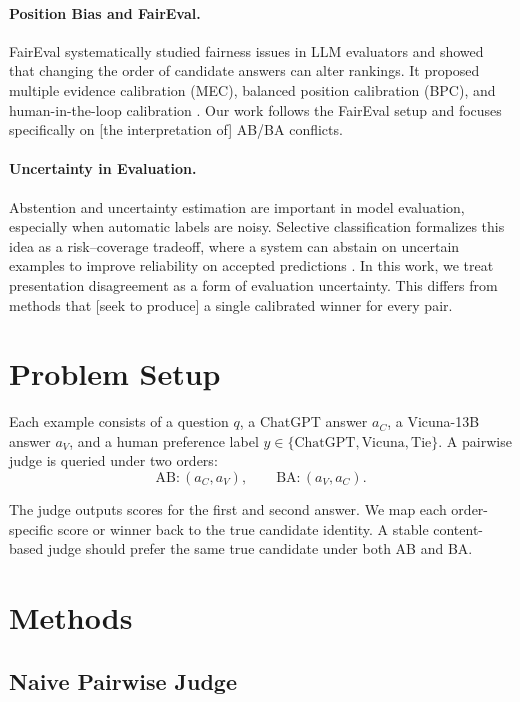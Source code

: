 \documentclass[11pt]{article}
\begin{document}
\paragraph{Position Bias and FairEval.}
FairEval systematically studied fairness issues in LLM evaluators and showed that changing the order of candidate answers can alter rankings. It proposed multiple evidence calibration (MEC), balanced position calibration (BPC), and human-in-the-loop calibration \cite{wang2024faireval}. Our work follows the FairEval setup and focuses specifically on [the interpretation of] AB/BA conflicts.

\paragraph{Uncertainty in Evaluation.}
Abstention and uncertainty estimation are important in model evaluation, especially when automatic labels are noisy. Selective classification formalizes this idea as a risk--coverage tradeoff, where a system can abstain on uncertain examples to improve reliability on accepted predictions \cite{geifman2017selective}. In this work, we treat presentation disagreement as a form of evaluation uncertainty. This differs from methods that [seek to produce] a single calibrated winner for every pair.

\section{Problem Setup}

Each example consists of a question $q$, a ChatGPT answer $a_C$, a Vicuna-13B answer $a_V$, and a human preference label $y \in \{\text{ChatGPT}, \text{Vicuna}, \text{Tie}\}$. A pairwise judge is queried under two orders:
\[
\text{AB}: (a_C, a_V), \qquad
\text{BA}: (a_V, a_C).
\]

The judge outputs scores for the first and second answer. We map each order-specific score or winner back to the true candidate identity. A stable content-based judge should prefer the same true candidate under both AB and BA.

\section{Methods}

\subsection{Naive Pairwise Judge}
\end{document}
